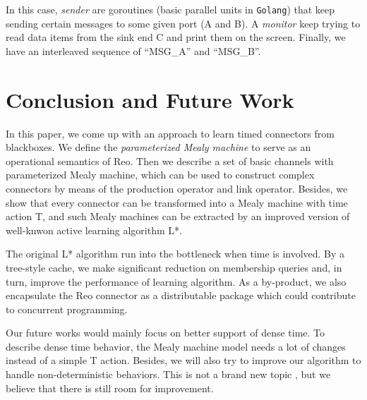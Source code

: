 \documentclass[conference, a4paper]{IEEEtran}
\begin{document}
In this case, \emph{sender} are goroutines (basic parallel units in \texttt{Golang}) that keep
sending certain messages to some given port (A and B). A \emph{monitor} keep trying to read data
items from the sink end C and print them on the screen. Finally, we have an interleaved sequence of
``MSG\_A'' and ``MSG\_B''.
 
\section{Conclusion and Future Work}
In this paper, we come up with an approach to learn timed connectors from blackboxes. We define
the \emph{parameterized Mealy machine} to serve as an operational semantics of Reo. Then we
describe a set of basic channels with parameterized Mealy machine, which can be used to construct
complex connectors by means of the production operator and link operator.
Besides, we show that every connector can be transformed into a Mealy
machine with time action T, and such Mealy machines can be extracted by an improved version of
well-knwon active learning algorithm L*.

The original L* algorithm run into the bottleneck when time is involved. By a tree-style cache, we
make significant reduction on membership queries and, in turn, improve the performance of learning
algorithm. As a by-product, we also encapsulate the Reo connector as a distributable package which
could contribute to concurrent programming.

Our future works would mainly focus on better support of dense time. To describe dense
time behavior, the Mealy machine model needs a lot of changes instead of a simple T action. Besides,
we will also try to improve our algorithm to handle non-deterministic behaviors. This is not a brand
new topic \cite{DBLP:journals/eceasst/VolpatoT15}, but we believe that there is still room for
improvement.  


\end{document}
